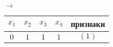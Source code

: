 \documentclass[12pt,a4paper]{article}
\begin{document}
\begin{table}[h!]
\begin{tabular}{|c|c|c|c||c|}
	\end{tabular}


\medskip

$\rightarrow$


\begin{tabular}{|c|c|c|c||c|}
	
	\hline
	$x_1$ & $x_2$ & $x_3$ & $x_4$ & признаки  \\
	\hline
	\hline
	$0$ & $1$ & $1$ & $1$ & $(1)$  \\
	\hline
	
\end{tabular}


\end{table} 
\end{document}
